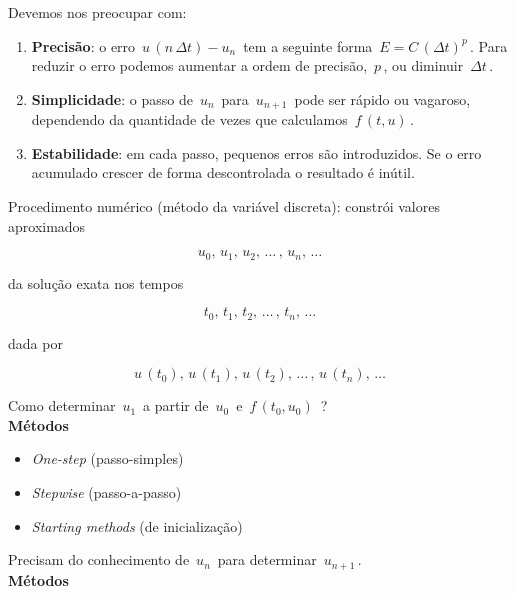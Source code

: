 Devemos nos preocupar com:

\begin{enumerate}

\item \textbf{Precisão}: o erro $ \, u \, (n \, \Delta t) - u_n \, $ tem a seguinte forma $ \, E = C \, (\Delta t)^p \, $. Para reduzir o erro podemos aumentar a ordem de precisão, $ \, p \, $, ou diminuir $ \, \Delta t \, $.

\item \textbf{Simplicidade}: o passo de $ \, u_n \, $ para $ \, u_{n+1} \, $ pode ser rápido ou vagaroso, dependendo da quantidade de vezes que calculamos $ \, f \, (t, u) \, $.

\item \textbf{Estabilidade}: em cada passo, pequenos erros são introduzidos. Se o erro acumulado crescer de forma descontrolada o resultado é inútil.

\end{enumerate}

Procedimento numérico (método da variável discreta): constrói valores aproximados

\[
 u_0, \, u_1, \, u_2, \, \ldots \, , \, u_n, \, \ldots
\]

da solução exata nos tempos

\[
 t_0, \, t_1, \, t_2, \, \ldots \, , \, t_n, \, \ldots
\]

dada por

\[
 u \, (t_0), \, u \, (t_1), \, u \, (t_2), \, \ldots \, , \, u \, (t_n), \, \ldots
\]

Como determinar $ \, u_1 \, $ a partir de $ \, u_0 \, $ e $ \, f \, (t_0, u_0) \, $ ?\\

\textbf{Métodos}

\begin{itemize}

\item \textit{One-step} (passo-simples)

\item \textit{Stepwise} (passo-a-passo)

\item \textit{Starting methods} (de inicialização)

\end{itemize}

Precisam do conhecimento de $ \, u_n \, $ para determinar $ \, u_{n+1} \, $.\\

\textbf{Métodos}

